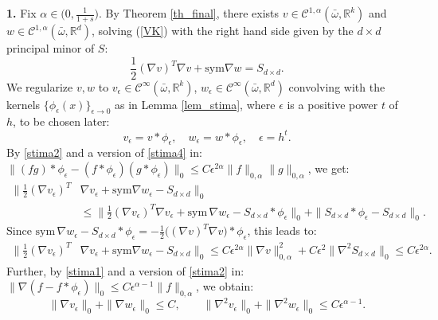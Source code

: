 \documentclass[reqno,twoside,11pt]{amsart}
\newcommand{\sym}{\mathrm{sym}}
\newcommand{\R}{\mathbb{R}}
\numberwithin{equation}{section}
\theoremstyle{plain}
\theoremstyle{definition}
\begin{document}
\medskip


{\bf 1.} Fix $\alpha\in \big(0,\frac{1}{1+s}\big)$. By Theorem \ref{th_final}, 
there exists $v\in\mathcal{C}^{1,\alpha }(\bar\omega,\R^k)$
and $w\in \mathcal{C}^{1,\alpha}(\bar\omega,\R^d)$, solving (\ref{VK})
with the right hand side given by the $d\times d$ principal minor of $S$:
\begin{equation}\label{exactMAM}
\frac{1}{2}(\nabla v)^T\nabla v + \sym\nabla w = S_{d\times d}.
\end{equation}
We regularize $v,w$ to
$v_\epsilon\in\mathcal{C}^\infty(\bar\omega,\R^k)$, $w_\epsilon\in \mathcal{C}^\infty(\bar\omega,\R^d)$
convolving with the kernels $\{\phi_\epsilon(x) \}_{\epsilon\to 0}$ as in Lemma \ref{lem_stima},
where  $\epsilon$ is a positive power $t$ of $h$, to be chosen later:
$$ v_\epsilon= v *\phi_\epsilon,\quad w_\epsilon=w*\phi_\epsilon, \quad \epsilon=h^t.$$
By \ref{stima2} and a version of \ref{stima4} in: $\|(fg)*\phi_\epsilon - (f*\phi_\epsilon)
(g*\phi_\epsilon)\|_0\leq C\epsilon^{2\alpha} \|f\|_{0,\alpha} \|g\|_{0,\alpha} $, we get:
\begin{equation*}
\begin{split}
\big\| \frac{1}{2}(\nabla v_\epsilon)^T&\nabla v_\epsilon  +
\sym\nabla w_\epsilon - S_{d\times d}\big\|_0\\ & \leq \big\|
\frac{1}{2}(\nabla v_\epsilon)^T\nabla v_\epsilon + \mathrm{sym}\,\nabla w_\epsilon - S_{d\times
  d}*\phi_\epsilon\big\|_0 + \| S_{d\times d}*\phi_\epsilon- S_{d\times d}\|_0.
\end{split}
\end{equation*}
Since $\mathrm{sym}\,\nabla w_\epsilon - S_{d\times d}*\phi_\epsilon=
- \frac{1}{2}\big((\nabla v)^T\nabla v\big)*\phi_\epsilon$, this leads to:
\begin{equation}\label{m1}
\begin{split}
\big\| \frac{1}{2}(\nabla v_\epsilon)^T&\nabla v_\epsilon  +
\sym\nabla w_\epsilon - S_{d\times d}\big\|_0\leq
C\epsilon^{2\alpha}\|\nabla v\|_{0,\alpha}^2 + C\epsilon^2 \|\nabla^2S_{d\times d}\|_0\leq C\epsilon^{2\alpha}.
\end{split}
\end{equation}
 Further, by \ref{stima1} and a version of \ref{stima2} in: $\|\nabla
 (f-f*\phi_\epsilon)\|_0\leq C\epsilon^{\alpha-1}\|f\|_{0,\alpha}$, we obtain:
\begin{equation}\label{m2}
\|\nabla v_\epsilon\|_0 + \|\nabla w_\epsilon\|_0 \leq C,\qquad 
\|\nabla^2v_\epsilon\|_0+ \|\nabla^2w_\epsilon\|_0 \leq C\epsilon^{\alpha-1}.
\end{equation}
\end{document}

